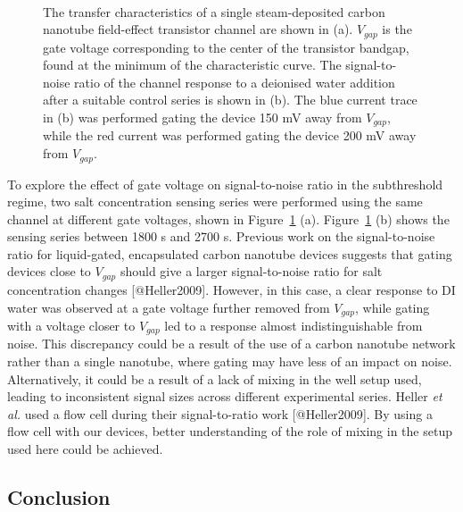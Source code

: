 \documentclass[
  letterpaper,
  DIV=11,
  numbers=noendperiod]{scrartcl}
\begin{document}
\begin{figure}
\begin{minipage}[t]{0.57\linewidth}
{{}

}

\end{minipage}%
%
\begin{minipage}[t]{0.19\linewidth}

{\centering 

~

}

\end{minipage}%

\caption{\label{fig-salt-conc-SNR}The transfer characteristics of a
single steam-deposited carbon nanotube field-effect transistor channel
are shown in (a). \(V_{gap}\) is the gate voltage corresponding to the
center of the transistor bandgap, found at the minimum of the
characteristic curve. The signal-to-noise ratio of the channel response
to a deionised water addition after a suitable control series is shown
in (b). The blue current trace in (b) was performed gating the device
150 mV away from \(V_{gap}\), while the red current was performed gating
the device 200 mV away from \(V_{gap}\).}

\end{figure}

To explore the effect of gate voltage on signal-to-noise ratio in the
subthreshold regime, two salt concentration sensing series were
performed using the same channel at different gate voltages, shown in
Figure~\ref{fig-salt-conc-SNR} (a). Figure~\ref{fig-salt-conc-SNR} (b)
shows the sensing series between 1800 s and 2700 s. Previous work on the
signal-to-noise ratio for liquid-gated, encapsulated carbon nanotube
devices suggests that gating devices close to \(V_{gap}\) should give a
larger signal-to-noise ratio for salt concentration changes
{[}@Heller2009{]}. However, in this case, a clear response to DI water
was observed at a gate voltage further removed from \(V_{gap}\), while
gating with a voltage closer to \(V_{gap}\) led to a response almost
indistinguishable from noise. This discrepancy could be a result of the
use of a carbon nanotube network rather than a single nanotube, where
gating may have less of an impact on noise. Alternatively, it could be a
result of a lack of mixing in the well setup used, leading to
inconsistent signal sizes across different experimental series. Heller
\emph{et al.} used a flow cell during their signal-to-ratio work
{[}@Heller2009{]}. By using a flow cell with our devices, better
understanding of the role of mixing in the setup used here could be
achieved.

\hypertarget{conclusion}{%
\subsection{Conclusion}\label{conclusion}}
\end{document}
